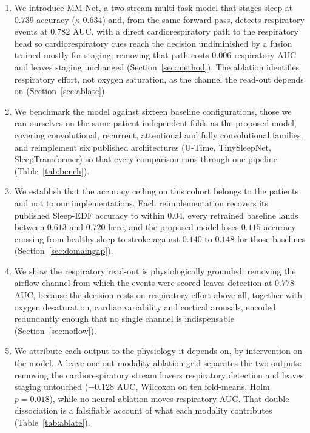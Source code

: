 \documentclass{ieeeaccess}
\newcommand{\mmAcc}{0.739}   %
\newcommand{\mmK}{0.634}     %
\newcommand{\mmAuc}{0.782}   %
\newcommand{\noflowAuc}{0.778}
\begin{document}
\begin{enumerate}
\item \label{c:model}We introduce MM-Net, a two-stream multi-task model that stages sleep at $\mmAcc$
accuracy ($\kappa$ $\mmK$) and, from the same forward pass, detects respiratory events at
$\mmAuc$ AUC, with a direct cardiorespiratory path to the respiratory head so
cardiorespiratory cues reach the decision undiminished by a fusion trained mostly
for staging; removing that path costs $0.006$ respiratory AUC and leaves staging unchanged
(Section~\ref{sec:method}). The ablation identifies respiratory effort, not oxygen
saturation, as the channel the read-out depends on (Section~\ref{sec:ablate}).

\item \label{c:bench}We benchmark the model against sixteen baseline configurations, those we ran ourselves
on the same patient-independent folds as the proposed model, covering convolutional, recurrent, attentional and fully
convolutional families, and reimplement six published architectures (U-Time,
TinySleepNet, SleepTransformer) so that every comparison runs through one pipeline
(Table~\ref{tab:bench}).

\item \label{c:ceiling}We establish that the accuracy ceiling on this cohort belongs to the patients and
not to our implementations. Each reimplementation recovers its published Sleep-EDF
accuracy to within $0.04$, every retrained baseline lands between $0.613$ and $0.720$
here, and the proposed model loses $0.115$ accuracy crossing from healthy sleep to stroke
against $0.140$ to $0.148$ for those baselines (Section~\ref{sec:domaingap}).

\item \label{c:resp}We show the respiratory read-out is physiologically grounded: removing the airflow
channel from which the events were scored leaves detection at $\noflowAuc$ AUC, because
the decision rests on respiratory effort above all, together with oxygen desaturation,
cardiac variability and cortical arousals, encoded redundantly enough that no single
channel is indispensable (Section~\ref{sec:noflow}).

\item \label{c:attrib}We attribute each output to the physiology it depends on, by
intervention on the model. A
leave-one-out modality-ablation grid separates the two outputs: removing the
cardiorespiratory stream lowers respiratory detection and leaves staging untouched
($-0.128$ AUC, Wilcoxon on ten fold-means, Holm $p=0.018$), while no neural ablation
moves respiratory AUC. That double dissociation is a falsifiable account of what each
modality contributes (Table~\ref{tab:ablate}).
\end{enumerate}
\end{document}
